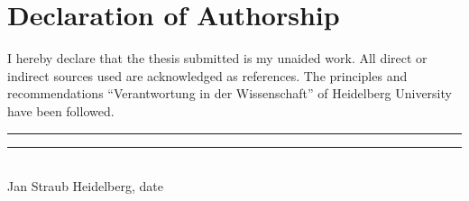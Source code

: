 
\section*{Declaration of Authorship}

I hereby declare that the thesis submitted is my unaided work. All direct or indirect sources used are acknowledged as references. The principles and recommendations \enquote{Verantwortung in der Wissenschaft} of Heidelberg University have been followed.
\vspace{5cm}\\
\noindent\rule[0.5ex]{8em}{0.5pt} \hfill \rule[0.5ex]{10em}{0.5pt}\\
\noindent Jan Straub \hfill Heidelberg, date